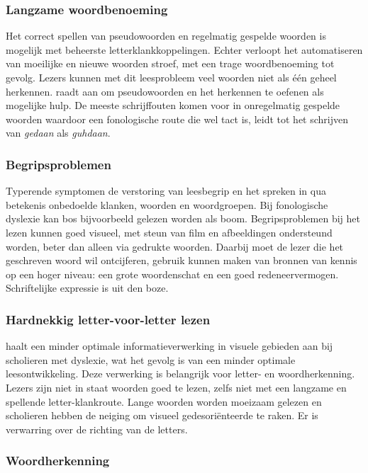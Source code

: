 \subsubsection{Langzame woordbenoeming}

Het correct spellen van pseudowoorden en regelmatig gespelde woorden is mogelijk met beheerste letterklankkoppelingen. Echter verloopt het automatiseren van moeilijke en nieuwe woorden stroef, met een trage woordbenoeming tot gevolg. Lezers kunnen met dit leesprobleem veel woorden niet als één geheel herkennen. \textcite{Filipak2020} raadt aan om pseudowoorden en het herkennen te oefenen als mogelijke hulp. De meeste schrijffouten komen voor in onregelmatig gespelde woorden waardoor een fonologische route die wel tact is, leidt tot het schrijven van \textit{gedaan} als \textit{guhdaan}.

\subsubsection{Begripsproblemen}

Typerende symptomen de verstoring van leesbegrip en het spreken in qua betekenis onbedoelde klanken, woorden en woordgroepen. Bij fonologische dyslexie kan bos bijvoorbeeld gelezen worden als boom. Begripsproblemen bij het lezen kunnen goed visueel, met steun van film en afbeeldingen ondersteund worden, beter dan alleen via gedrukte woorden. Daarbij moet de lezer die het geschreven woord wil ontcijferen, gebruik kunnen maken van bronnen van kennis op een hoger niveau: een grote woordenschat en een goed redeneervermogen. Schriftelijke expressie is uit den boze.

\subsubsection{Hardnekkig letter-voor-letter lezen}

\textcite{Bonte2020} haalt een minder optimale informatieverwerking in visuele gebieden aan bij scholieren met dyslexie, wat het gevolg is van een minder optimale leesontwikkeling. Deze verwerking is belangrijk voor letter- en woordherkenning. Lezers zijn niet in staat woorden goed te lezen, zelfs niet met een langzame en spellende letter-klankroute. Lange woorden worden moeizaam gelezen en scholieren hebben de neiging om visueel gedesoriënteerde te raken. Er is verwarring over de richting van de letters.

\subsubsection{Woordherkenning}

